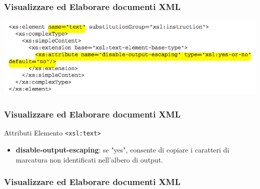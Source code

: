 \begin{frame}
    \frametitle{Visualizzare ed Elaborare documenti XML}
    \addtocounter{nframe}{1}
    
    \begin{center}
        \includegraphics[width=.9\textwidth]{imgs/Schema-text.png}
    \end{center}

\end{frame}

\begin{frame}
    \frametitle{Visualizzare ed Elaborare documenti XML}
    \addtocounter{nframe}{1}
    

     \begin{block}{Attributi Elemento \texttt{<xsl:text>}}
         \begin{itemize}
             \item \textbf{disable-output-escaping}: se "yes", consente di copiare i caratteri di marcatura non identificati nell'albero di output.
        \end{itemize}
     \end{block}
    
\end{frame}

\begin{frame}
    \frametitle{Visualizzare ed Elaborare documenti XML}
    \addtocounter{nframe}{1}
    


\end{frame}

